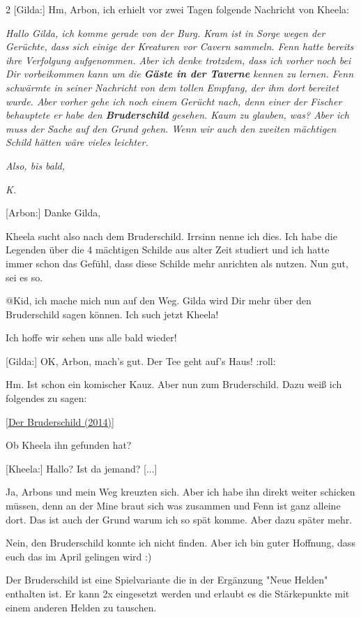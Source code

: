 \documentclass[10pt, a4paper, oneside]{book}
\newcommand{\refstorytext}[1]{\hyperref[Storytext: #1]{#1}}
\begin{document}
\begin{multicols}{2}
[Gilda:] Hm, Arbon, ich erhielt vor zwei Tagen folgende Nachricht von Kheela:

\textit{Hallo Gilda, ich komme gerade von der Burg. Kram ist in Sorge wegen der Gerüchte, dass sich einige der Kreaturen vor Cavern sammeln. Fenn hatte bereits ihre Verfolgung aufgenommen. Aber ich denke trotzdem, dass ich vorher noch bei Dir vorbeikommen kann um die \textbf{Gäste in der Taverne} kennen zu lernen. Fenn schwärmte in seiner Nachricht von dem tollen Empfang, der ihm dort bereitet wurde. Aber vorher gehe ich noch einem Gerücht nach, denn einer der Fischer behauptete er habe den \textbf{Bruderschild} gesehen. Kaum zu glauben, was? Aber ich muss der Sache auf den Grund gehen. Wenn wir auch den zweiten mächtigen Schild hätten wäre vieles leichter.}

\textit{Also, bis bald,}

\textit{K.}

[Arbon:] Danke Gilda,

Kheela sucht also nach dem Bruderschild. Irrsinn nenne ich dies. Ich habe die Legenden über die 4 mächtigen Schilde aus alter Zeit studiert und ich hatte immer schon das Gefühl, dass diese Schilde mehr anrichten als nutzen. Nun gut, sei es so.

@Kid, ich mache mich nun auf den Weg. Gilda wird Dir mehr über den Bruderschild sagen können. Ich such jetzt Kheela!

Ich hoffe wir sehen uns alle bald wieder!

[Gilda:] OK, Arbon, mach's gut. Der Tee geht auf's Haus! :roll:

Hm. Ist schon ein komischer Kauz. Aber nun zum Bruderschild. Dazu weiß ich folgendes zu sagen:

[\refstorytext{Der Bruderschild (2014)}]

Ob Kheela ihn gefunden hat?

[Kheela:] Hallo? Ist da jemand? [...]

Ja, Arbons und mein Weg kreuzten sich. Aber ich habe ihn direkt weiter schicken müssen, denn an der Mine braut sich was zusammen und Fenn ist ganz alleine dort. Das ist auch der Grund warum ich so spät komme. Aber dazu später mehr.

Nein, den Bruderschild konnte ich nicht finden. Aber ich bin guter Hoffnung, dass euch das im April gelingen wird :)

Der Bruderschild ist eine Spielvariante die in der Ergänzung "Neue Helden" enthalten ist. Er kann 2x eingesetzt werden und erlaubt es die Stärkepunkte mit einem anderen Helden zu tauschen.


\end{multicols}
\end{document}
